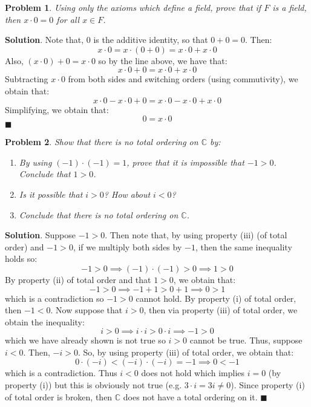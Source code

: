 \documentclass[12pt]{article}
\renewcommand{\=}[1]{\stackrel{#1}{=}} %
\newtheorem{p}{Problem}[section]
\theoremstyle{definition}
\newenvironment{s}{%
        \begin{trivlist} \item \textbf{Solution}. }{%
            \hspace*{\fill} $\blacksquare$\end{trivlist}}%
\begin{document}
\begin{p}
    Using only the axioms which define a field, prove that if $F$ is a field, then
    $x\cdot 0 = 0$ for all $x\in F$.
\end{p}
\begin{s}
    Note that, $0$ is the additive identity, so that $0 + 0 = 0$. Then:
    \[ x \cdot 0 = x \cdot (0 + 0) = x\cdot 0 + x\cdot 0 \]
    Also, $(x\cdot 0) + 0 = x\cdot 0$ so by the line above, we have that:
    \[x\cdot 0 + 0 = x\cdot 0 + x\cdot 0\]
    Subtracting $x\cdot 0$ from both sides and switching orders (using commutivity),
    we obtain that:
    \[x\cdot 0 - x\cdot 0 + 0 = x\cdot 0 - x\cdot 0 + x\cdot 0\]
    Simplifying, we obtain that:
    \[0 = x\cdot 0\]
\end{s}

\begin{p}
    Show that there is no total ordering on $\mathbb{C}$ by:
    \begin{enumerate}
        \item By using $(-1)\cdot(-1)=1$, prove that it is impossible that $-1 > 0$.
            Conclude that $1 > 0$.
        \item Is it possible that $i > 0$? How about $i < 0$?
        \item Conclude that there is no total ordering on $\mathbb{C}$.
    \end{enumerate}
\end{p}
\begin{s}
    Suppose $-1 > 0$. Then note that, by using property (iii) (of total order) and $-1 > 0$, if we multiply
    both sides by $-1$, then the same inequality holds so:
    \[-1 > 0 \implies (-1) \cdot (-1) > 0 \implies 1 > 0\]
    By property (ii) of total order and that $1 > 0$, we obtain that:
    \[ -1 > 0 \implies -1 + 1 > 0 + 1 \implies 0 > 1\] which is a contradiction so $-1 > 0$ cannot hold. By
    property (i) of total order, then $-1 < 0$. Now suppose that $i > 0$, then via property (iii) of total
    order, we obtain the inequality:
    \[i > 0 \implies i \cdot i > 0 \cdot i \implies -1 > 0\]
    which we have already shown is not true so $i > 0$ cannot be true. Thus, suppose $i < 0$. Then, $-i > 0$.
    So, by using property (iii) of total order, we obtain that:
    \[ 0 \cdot (-i) < (-i) \cdot (-i) = -1 \implies 0 < -1 \]
    which is a contradiction. Thus $i < 0$ does not hold which implies $i = 0$ (by property (i)) but this is
    obviously not true (e.g. $3 \cdot i = 3i \neq 0$). Since property (i) of total order is broken, then
    $\mathbb{C}$ does not have a total ordering on it.
\end{s}
\end{document}
